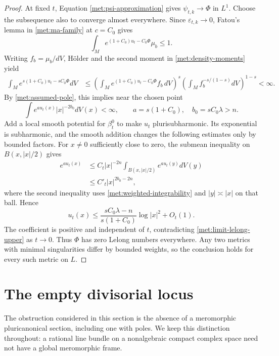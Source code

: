 \documentclass[11pt,letterpaper]{article}
\theoremstyle{definition}
\theoremstyle{remark}
\begin{document}
\begin{proof}
At fixed \(t\), Equation \eqref{met:psi-approximation} gives
\(\psi_{t,k}\to\Phi\) in \(L^1\).  Choose the subsequence also to
converge almost everywhere.  Since \(\varepsilon_{t,k}\to0\),
Fatou's lemma in \eqref{met:ma-family} at \(c=C_0\) gives
\begin{equation}
 \label{met:fatou-endpoint}
 \int_M e^{(1+C_0)u_t-C_0\Phi}\mu_b\leq1.
\end{equation}
Writing \(f_b=\mu_b/dV\), H\"older and the second moment in
\eqref{met:density-moments} yield
\begin{align*}
 \int_M e^{s(1+C_0)u_t-sC_0\Phi}dV
 &\leq
 \left(\int_M e^{(1+C_0)u_t-C_0\Phi}f_b\,dV\right)^s
 \left(\int_M f_b^{-s/(1-s)}dV\right)^{1-s}\!<\infty.
\end{align*}
By \eqref{met:assumed-pole}, this implies near the chosen point
\begin{equation}
 \label{met:weighted-integrability}
 \int e^{a u_t(x)}|x|^{-2b_0}dV(x)<\infty,
 \qquad a=s(1+C_0),\quad b_0=sC_0\lambda>n.
\end{equation}
Add a local smooth potential for \(\beta_t^0\) to make \(u_t\)
plurisubharmonic.  Its exponential is subharmonic, and the smooth
addition changes the following estimates only by bounded factors.
For \(x\neq0\) sufficiently close to zero, the submean inequality
on \(B(x,|x|/2)\) gives
\begin{align*}
 e^{a u_t(x)}
 &\leq C_t|x|^{-2n}
       \int_{B(x,|x|/2)} e^{a u_t(y)}dV(y)\\
 &\leq C'_t|x|^{2b_0-2n},
\end{align*}
where the second inequality uses
\eqref{met:weighted-integrability} and \(|y|\asymp|x|\) on that
ball.  Hence
\begin{equation}
 \label{met:lelong-lower}
 u_t(x)\leq
 \frac{sC_0\lambda-n}{s(1+C_0)}\log|x|^2+O_t(1).
\end{equation}
The coefficient is positive and independent of \(t\), contradicting
\eqref{met:limit-lelong-upper} as \(t\to0\).  Thus \(\Phi\) has zero
Lelong numbers everywhere.  Any two metrics with minimal
singularities differ by bounded weights, so the conclusion holds
for every such metric on \(L\).
\end{proof}

\section{The empty divisorial locus}
\label{fol:section}

The obstruction considered in this section is the absence of a meromorphic
pluricanonical section, including one with poles.  We keep this distinction
throughout: a rational line bundle on a nonalgebraic compact complex space
need not have a global meromorphic frame.
\end{document}
